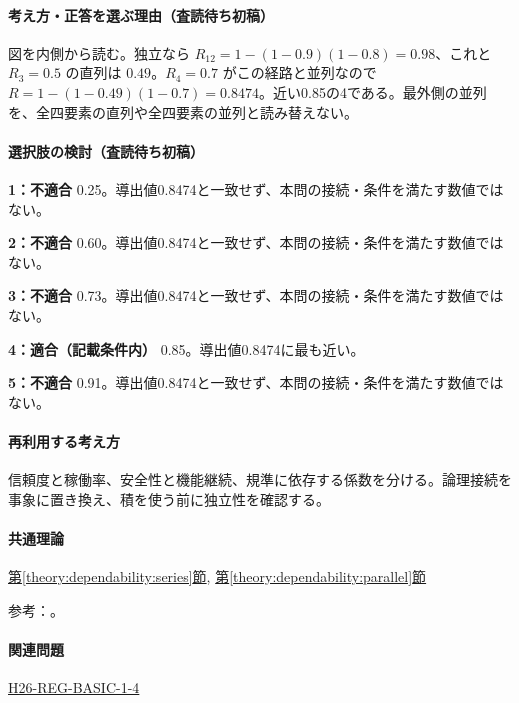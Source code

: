 \paragraph{考え方・正答を選ぶ理由（査読待ち初稿）} 図を内側から読む。独立なら \(R_{12}=1-(1-0.9)(1-0.8)=0.98\)、これと \(R_3=0.5\) の直列は \(0.49\)。\(R_4=0.7\) がこの経路と並列なので \(R=1-(1-0.49)(1-0.7)=0.8474\)。近い0.85の4である。最外側の並列を、全四要素の直列や全四要素の並列と読み替えない。

\paragraph{選択肢の検討（査読待ち初稿）}\mbox{}\par

\noindent\textbf{1：不適合} 0.25。導出値0.8474と一致せず、本問の接続・条件を満たす数値ではない。\par

\noindent\textbf{2：不適合} 0.60。導出値0.8474と一致せず、本問の接続・条件を満たす数値ではない。\par

\noindent\textbf{3：不適合} 0.73。導出値0.8474と一致せず、本問の接続・条件を満たす数値ではない。\par

\noindent\textbf{4：適合（記載条件内）} 0.85。導出値0.8474に最も近い。\par

\noindent\textbf{5：不適合} 0.91。導出値0.8474と一致せず、本問の接続・条件を満たす数値ではない。\par

\paragraph{再利用する考え方} 信頼度と稼働率、安全性と機能継続、規準に依存する係数を分ける。論理接続を事象に置き換え、積を使う前に独立性を確認する。

\paragraph{共通理論} \hyperref[theory:dependability:series]{第\ref*{theory:dependability:series}節}, \hyperref[theory:dependability:parallel]{第\ref*{theory:dependability:parallel}節}

\par 参考：\cite{reliability_nist_series,reliability_nist_parallel}。

\paragraph{関連問題} \hyperref[q:h26-reg-basic-1-4]{H26-REG-BASIC-1-4}

